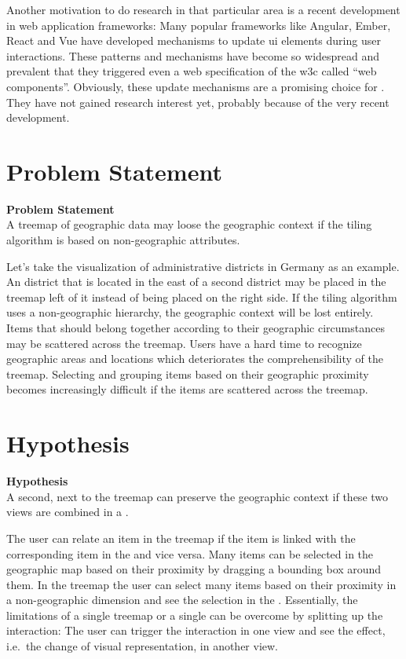 Another motivation to do research in that particular area is a recent development in web application frameworks:
Many popular frameworks like Angular, Ember, React and Vue have developed mechanisms to update \gls{ui} elements during user interactions.
These patterns and mechanisms have become so widespread and prevalent that they triggered even a web specification of the \gls{w3c} called ``web components''.
Obviously, these update mechanisms are a promising choice for \cmvs{}.
They have not gained research interest yet, probably because of the very recent development.

\section{Problem Statement}
\begin{tcolorbox}
\textbf{Problem Statement} \\
A treemap of geographic data may loose the geographic context if the tiling algorithm is based on non-geographic attributes.
\end{tcolorbox}

Let's take the visualization of administrative districts in Germany as an example.
An  district that is located in the east of a second district may be placed in the treemap left of it instead of being placed on the right side.
If the tiling algorithm uses a non-geographic hierarchy, the geographic context will be lost entirely.
Items that should belong together according to their geographic circumstances may be scattered across the treemap.
Users have a hard time to recognize geographic areas and locations which deteriorates the comprehensibility of the treemap.
Selecting and grouping items based on their geographic proximity becomes increasingly difficult if the items are scattered across the treemap.


\section{Hypothesis}\label{sec:introduction:hypothesis}

\begin{tcolorbox}
\textbf{Hypothesis} \\
A second, \gv{} next to the treemap can preserve the geographic context if these two views are combined in a \cmv{}.
\end{tcolorbox}

The user can relate an item in the treemap if the item is linked with the corresponding item in the \gv{} and vice versa.
Many items can be selected in the geographic map based on their proximity by dragging a bounding box around them.
In the treemap the user can select many items based on their proximity in a non-geographic dimension and see the selection in the \gv{}.
Essentially,  the limitations of a single treemap or a single \gv{} can be overcome by splitting up the interaction:
The user can trigger the interaction in one view and see the effect, i.e.\ the change of visual representation, in another view.


